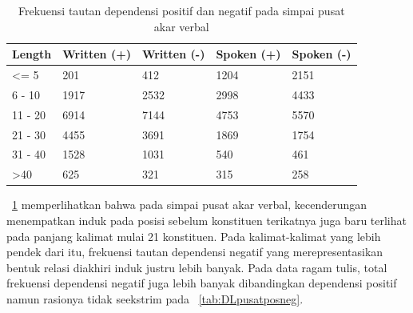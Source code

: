 \documentclass[10pt, a4paper, conference, compsocconf]{IEEEtran}
\begin{document}
\begin{table}
\begin{center}
\caption{Frekuensi tautan dependensi positif dan negatif pada simpai pusat akar verbal}  \label{tab:tautanpusatposneg}
\begin{tabular}{p{1.1cm} p{1.2cm} p{1.2cm} p{1.3cm} p{1.3cm}}
    \hline
Length & Written (+) & Written (-) & Spoken (+) & Spoken (-) \\ \hline
\textless= 5 	& 201	& 412 & 1204 & 2151 \\
6 - 10 		& 1917	& 2532 & 2998 & 4433 \\
11 - 20 		& 6914 	& 7144 & 4753 & 5570 \\
21 - 30 		& 4455	& 3691 & 1869 & 1754 \\
31 - 40 		& 1528	& 1031 & 540 & 461 \\
\textgreater 40 	& 625	& 321 & 315 & 258 \\ \hline
   \end{tabular}
\end{center}
\end{table}

\tab~\ref{tab:tautanpusatposneg} memperlihatkan bahwa pada simpai pusat akar verbal, kecenderungan menempatkan induk pada posisi sebelum konstituen terikatnya juga baru terlihat pada panjang kalimat mulai 21 konstituen. Pada kalimat-kalimat yang lebih pendek dari itu, frekuensi tautan dependensi negatif yang merepresentasikan bentuk relasi diakhiri induk justru lebih banyak. Pada data ragam tulis, total frekuensi dependensi negatif juga lebih banyak dibandingkan dependensi positif namun rasionya tidak seekstrim pada \tab~\ref{tab:DLpusatposneg}.
\end{document}
